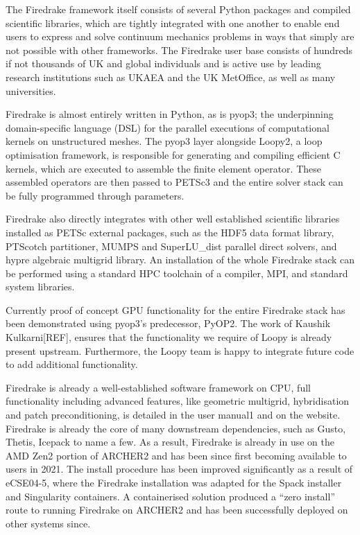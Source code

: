 \documentclass[a4paper,11pt]{article}
\begin{document}
The Firedrake framework itself consists of several Python packages and compiled scientific libraries, which are tightly integrated with one another to enable end users to express and solve continuum mechanics problems in ways that simply are not possible with other frameworks.
The Firedrake user base consists of hundreds if not thousands of UK and global individuals and is active use by leading research institutions such as UKAEA and the UK MetOffice, as well as many universities. 

Firedrake is almost entirely written in Python, as is pyop3; the underpinning domain-specific language (DSL) for the parallel executions of computational kernels on unstructured meshes.
The pyop3 layer alongside Loopy2, a loop optimisation framework, is responsible for generating and compiling efficient C kernels, which are executed to assemble the finite element operator.
These assembled operators are then passed to PETSc3 and the entire solver stack can be fully programmed through parameters. 

Firedrake also directly integrates with other well established scientific libraries installed as PETSc external packages, such as the HDF5 data format library, PTScotch partitioner, MUMPS and SuperLU\_dist parallel direct solvers, and hypre algebraic multigrid library. An installation of the whole Firedrake stack can be performed using a standard HPC toolchain of a compiler, MPI, and standard system libraries. 

Currently proof of concept GPU functionality for the entire Firedrake stack has been demonstrated using pyop3's predecessor, PyOP2.
The work of Kaushik Kulkarni[REF], ensures that the functionality we require of Loopy is already present upstream.
Furthermore, the Loopy team is happy to integrate future code to add additional functionality. 

Firedrake is already a well-established software framework on CPU, full functionality including advanced features, like geometric multigrid, hybridisation and patch preconditioning, is detailed in the user manual1 and on the website.
Firedrake is already the core of many downstream dependencies, such as Gusto, Thetis, Icepack to name a few.
As a result, Firedrake is already in use on the AMD Zen2 portion of ARCHER2 and has been since first becoming available to users in 2021.
The install procedure has been improved significantly as a result of eCSE04-5, where the Firedrake installation was adapted for the Spack installer and Singularity containers.
A containerised solution produced a ``zero install'' route to running Firedrake on ARCHER2 and has been successfully deployed on other systems since. 
\end{document}
